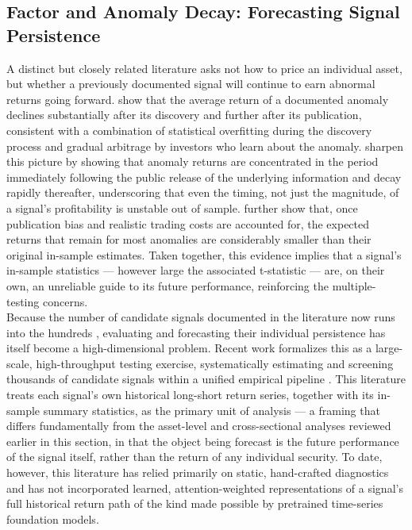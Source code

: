 \documentclass[pdflatex,sn-mathphys-num]{sn-jnl}%
\theoremstyle{thmstyleone}%
\theoremstyle{thmstyletwo}%
\theoremstyle{thmstylethree}%
\begin{document}
\subsection{Factor and Anomaly Decay: Forecasting Signal Persistence}
A distinct but closely related literature asks not how to price an individual asset, but whether a previously documented signal will continue to earn abnormal returns going forward. \citet{mclean2016does} show that the average return of a documented anomaly declines substantially after its discovery and further after its publication, consistent with a combination of statistical overfitting during the discovery process and gradual arbitrage by investors who learn about the anomaly. \citet{bowles2024anomaly} sharpen this picture by showing that anomaly returns are concentrated in the period immediately following the public release of the underlying information and decay rapidly thereafter, underscoring that even the timing, not just the magnitude, of a signal's profitability is unstable out of sample. \citet{chen2023zeroing} further show that, once publication bias and realistic trading costs are accounted for, the expected returns that remain for most anomalies are considerably smaller than their original in-sample estimates. Taken together, this evidence implies that a signal's in-sample statistics — however large the associated t-statistic — are, on their own, an unreliable guide to its future performance, reinforcing the multiple-testing concerns.\\

Because the number of candidate signals documented in the literature now runs into the hundreds \cite{green2017characteristics}, evaluating and forecasting their individual persistence has itself become a high-dimensional problem. Recent work formalizes this as a large-scale, high-throughput testing exercise, systematically estimating and screening thousands of candidate signals within a unified empirical pipeline \cite{Chen}. This literature treats each signal's own historical long-short return series, together with its in-sample summary statistics, as the primary unit of analysis — a framing that differs fundamentally from the asset-level and cross-sectional analyses reviewed earlier in this section, in that the object being forecast is the future performance of the signal itself, rather than the return of any individual security. To date, however, this literature has relied primarily on static, hand-crafted diagnostics and has not incorporated learned, attention-weighted representations of a signal's full historical return path of the kind made possible by pretrained time-series foundation models.\\
\end{document}
